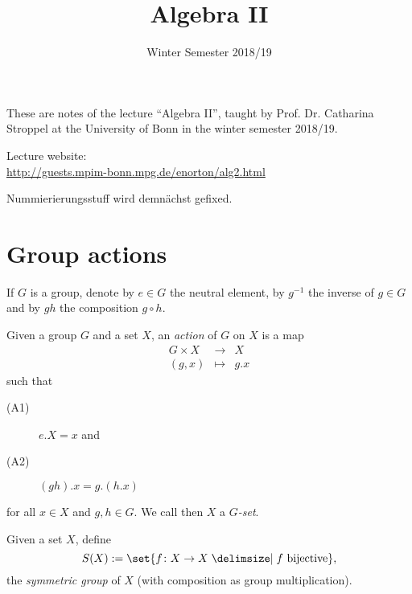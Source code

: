 \documentclass[12pt,a4paper]{scrartcl}
\title{Algebra II}
\subtitle{Winter Semester 2018/19}
\date{\lastcompiled}
\begin{document}
\begin{otherlanguage}{english}

\maketitle
\tableofcontents
\newpage

\noindent
These are notes of the lecture \enquote{Algebra II}, taught by Prof. Dr. Catharina Stroppel at the University of Bonn in the winter semester 2018/19.

\bigskip

\noindent
Lecture website:\\
\url{http://guests.mpim-bonn.mpg.de/enorton/alg2.html}

\nocite{hungerford}
\nocite{knapp-basic}
\nocite{knapp-advanced}
\nocite{procesi}
\nocite{borel}
\nocite{humphreys}
\nocite{springer}
\printbibliography

\newpage

Nummierierungsstuff wird demnächst gefixed.


\section{Group actions}
If $G$ is a group, denote by $e \in G$ the neutral element, by $g^{-1}$ the inverse of $g\in G$ and by $gh$ the composition $g \circ h$.
\begin{defi}
  Given a group $G$ and a set $X$, an \emph{action} of $G$ on $X$ is a map
  \begin{eqnarray*}
    G \times X &\to& X \\
    (g,x) &\mapsto& g.x
  \end{eqnarray*}
  such that
  \begin{description}
   \item[(A1)] $e.X = x$ and
   \item[(A2)] $(gh).x = g.(h.x)$
  \end{description}
  for all $x \in X$ and $g,h \in G$. We call then $X$ a \emph{$G$-set}.
\end{defi}
\begin{defi}
  Given a set $X$, define \[ S(X) := \set{f\colon X \to X \given f \text{ bijective}}, \] the \emph{symmetric group} of $X$ (with composition as group multiplication).
  

\end{defi}
\end{otherlanguage}
\end{document}
